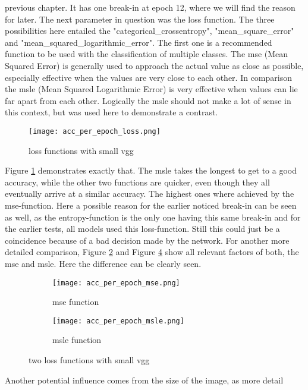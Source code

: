 previous chapter. It has one break-in at epoch 12, where we will find the reason
for later.
\newline
The next parameter in question was the loss function. The three possibilities
here entailed the "categorical\_crossentropy", "mean\_square\_error" and
"mean\_squared\_logarithmic\_error". The first one is a recommended function to
be used with the classification of multiple classes. The mse (Mean Squared
Error) is generally used to approach the actual value as close as possible,
especially effective when the values are very close to each other. In comparison
the msle (Mean Squared Logarithmic Error) is very effective when values can lie
far apart from each other. Logically the msle should not make a lot of sense in
this context, but was used here to demonstrate a contrast.
\begin{figure}
    \centering
    \texttt{[image: acc\_per\_epoch\_loss.png]}
    \caption{loss functions with small vgg}
    \label{fig:loss}
\end{figure}
Figure \ref{fig:loss} demonstrates exactly that. The msle takes the longest to
get to a good accuracy, while the other two functions are quicker, even though
they all eventually arrive at a similar accuracy. The highest ones where
achieved by the mse-function. Here a possible reason for the earlier noticed
break-in can be seen as well, as the entropy-function is the only one having
this same break-in and for the earlier tests, all models used this
loss-function. Still this could just be a coincidence because of a bad decision
made by the network.
\newline
For another more detailed comparison, Figure \ref{fig:mse} and Figure \ref{fig:msle} show all
relevant factors of both, the mse and msle. Here the difference can be clearly
seen.
\begin{figure}
\begin{subfigure}{.25\textwidth}
    \centering
    \texttt{[image: acc\_per\_epoch\_mse.png]}
    \caption{mse function}
    \label{fig:mse}
\end{subfigure}
\begin{subfigure}{.25\textwidth}
    \centering
    \texttt{[image: acc\_per\_epoch\_msle.png]}
    \caption{msle function}
    \label{fig:msle}
\end{subfigure}
\caption{two loss functions with small vgg}
\end{figure}
\newline
Another potential influence comes from the size of the image, as more detail
